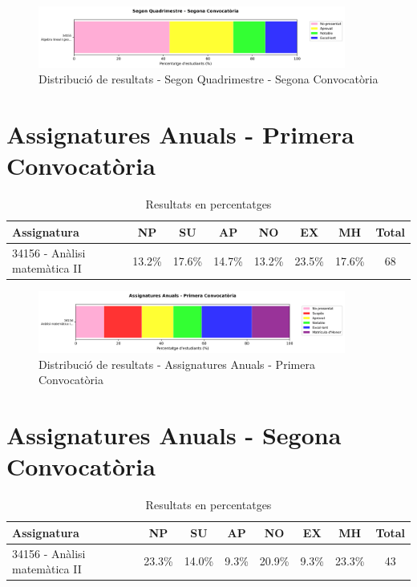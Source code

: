 \documentclass[12pt,a4paper]{article}
\begin{document}
\begin{figure}[H]
\centering
\includegraphics[width=0.9\textwidth]{graficos/barras_2Q2.png}
\caption{Distribució de resultats - Segon Quadrimestre - Segona Convocatòria}
\end{figure}

\clearpage


\section{Assignatures Anuals - Primera Convocatòria}

\begin{table}[H]
\centering
\small
\begin{tabular}{|p{4cm}|c|c|c|c|c|c|c|}
\hline
\textbf{Assignatura} & \textbf{NP} & \textbf{SU} & \textbf{AP} & \textbf{NO} & \textbf{EX} & \textbf{MH} & \textbf{Total} \\
\hline
34156 - Anàlisi matemàtica II & 13.2\% & 17.6\% & 14.7\% & 13.2\% & 23.5\% & 17.6\% & 68 \\
\hline
\end{tabular}
\caption{Resultats en percentatges}
\end{table}


\begin{figure}[H]
\centering
\includegraphics[width=0.9\textwidth]{graficos/barras_A1.png}
\caption{Distribució de resultats - Assignatures Anuals - Primera Convocatòria}
\end{figure}

\clearpage


\section{Assignatures Anuals - Segona Convocatòria}

\begin{table}[H]
\centering
\small
\begin{tabular}{|p{4cm}|c|c|c|c|c|c|c|}
\hline
\textbf{Assignatura} & \textbf{NP} & \textbf{SU} & \textbf{AP} & \textbf{NO} & \textbf{EX} & \textbf{MH} & \textbf{Total} \\
\hline
34156 - Anàlisi matemàtica II & 23.3\% & 14.0\% & 9.3\% & 20.9\% & 9.3\% & 23.3\% & 43 \\
\hline
\end{tabular}
\caption{Resultats en percentatges}
\end{table}
\end{document}
